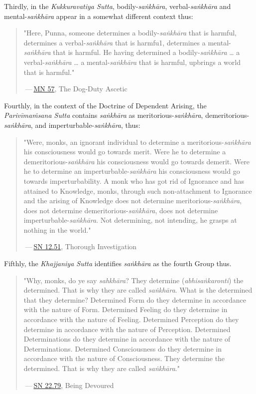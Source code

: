Thirdly, in the \emph{Kukkuravatiya Sutta}, bodily-\emph{saṅkhāra}, verbal-\emph{saṅkhāra} and mental-\emph{saṅkhāra} appear in a somewhat different context thus:

\begin{quote}
"Here, Punna, someone determines a bodily-\emph{saṅkhāra} that is harmful, determines a verbal-\emph{saṅkhāra} that is harmfu1, determines a mental-\emph{saṅkhāra} that is harmful. He having determined a bodily-\emph{saṅkhāra} \ldots{} a verbal-\emph{saṅkhāra} \ldots{} a mental-\emph{saṅkhāra} that is harmful, upbrings a world that is harmful."

 --- \href{https://suttacentral.net/mn57/en/bodhi}{MN 57}, The Dog-Duty Ascetic
\end{quote}

Fourthly, in the context of the Doctrine of Dependent Arising, the \emph{Parivīmaṁsana Sutta} contains \emph{saṅkhāra} as meritorious-\emph{saṅkhāra}, demeritorious-\emph{saṅkhāra}, and imperturbable-\emph{saṅkhāra}, thus:

\begin{quote}
"Were, monks, an ignorant individual to determine a meritorious-\emph{saṅkhāra} his consciousness would go towards merit. Were he to determine a demeritorious-\emph{saṅkhāra} his consciousness would go towards demerit. Were he to determine an imperturbable-\emph{saṅkhāra} his consciousness would go towards imperturbability. A monk who has got rid of Ignorance and has attained to Knowledge, monks, through such non-attachment to Ignorance and the arising of Knowledge does not determine meritorious-\emph{saṅkhāra}, does not determine demeritorious-\emph{saṅkhāra}, does not determine imperturbable-\emph{saṅkhāra}. Not determining, not intending, he grasps at nothing in the world."

 --- \href{https://suttacentral.net/sn12.51/en/sujato}{SN 12.51}, Thorough Investigation
\end{quote}

Fifthly, the \emph{Khajjaniya Sutta} identifies \emph{saṅkhāra} as the fourth Group thus.

\begin{quote}
"Why, monks, do ye say \emph{sahkhāra}? They determine (\emph{abhisaṅkaronti}) the determined. That is why they are called \emph{saṅkhāra}. What is the determined that they determine? Determined Form do they determine in accordance with the nature of Form. Determined Feeling do they determine in accordance with the nature of Feeling. Determined Perception do they determine in accordance with the nature of Perception. Determined Determinations do they determine in accordance with the nature of Determinations. Determined Consciousness do they determine in accordance with the nature of Consciousness. They determine the determined. That is why they are called \emph{saṅkhāra}."

 --- \href{https://suttacentral.net/sn22.79/en/bodhi}{SN 22.79}, Being Devoured
\end{quote}


